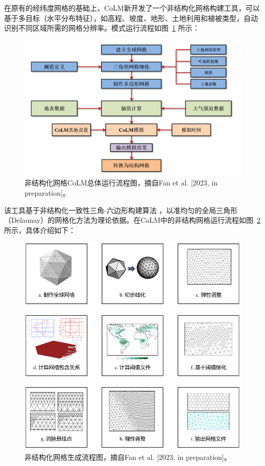 在原有的经纬度网格的基础上，CoLM新开发了一个非结构化网格构建工具，可以基于多目标（水平分布特征），如高程、坡度、地形、土地利用和植被类型，自动识别不同区域所需的网格分辨率。模式运行流程如图~\ref{fig:非结构化网格CoLM总体运行流程图} 所示：
 {
\begin{figure}[]
\centering
\includegraphics{Figures/模式构架/非结构化网格CoLM总体运行流程图.png}
\caption{非结构化网格CoLM总体运行流程图，摘自Fan et al. [2023, in preparation]。}
\label{fig:非结构化网格CoLM总体运行流程图}
\end{figure}
}

该工具基于非结构化一致性三角-六边形构建算法 \citep{fatichi2020soil,walko2008ocean,walko_direct_2011}，以准均匀的全局三角形（Delaunay）的网格化方法为理论依据。在CoLM中的非结构网格运行流程如图~\ref{fig:非结构化网格生成流程图} 所示，具体介绍如下：
{
\begin{figure}[]
\centering
\includegraphics{Figures/模式构架/非结构化网格生成流程图.png}
\caption{非结构化网格生成流程图，摘自Fan et al. [2023, in preparation]。}
\label{fig:非结构化网格生成流程图}
\end{figure}
}

